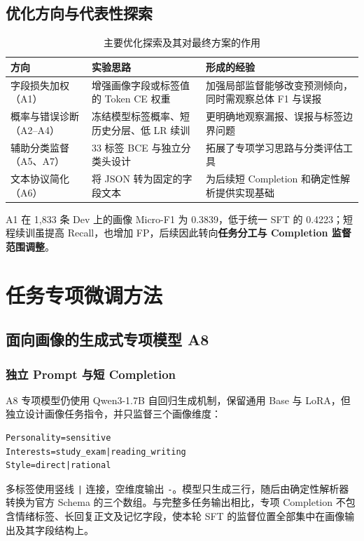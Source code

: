 \documentclass[UTF8,a4paper,zihao=-4,oneside]{ctexrep}
\newcommand{\textterm}[1]{\textbf{#1}}
\begin{document}
\section{优化方向与代表性探索}
\begin{table}[htbp]\centering\caption{主要优化探索及其对最终方案的作用}\label{tab:explorations}
\small
\begin{tabularx}{\linewidth}{P{2.55cm}P{4.0cm}Y}
\toprule
方向 & 实验思路 & 形成的经验\\\midrule
字段损失加权（A1） & 增强画像字段或标签值的 Token CE 权重 & 加强局部监督能够改变预测倾向，同时需观察总体 F1 与误报\\
概率与错误诊断（A2--A4） & 冻结模型标签概率、短历史分层、低 LR 续训 & 更明确地观察漏报、误报与标签边界问题\\
辅助分类监督（A5、A7） & 33 标签 BCE 与独立分类头设计 & 拓展了专项学习思路与分类评估工具\\
文本协议简化（A6） & 将 JSON 转为固定的字段文本 & 为后续短 Completion 和确定性解析提供实现基础\\
\bottomrule
\end{tabularx}
\end{table}

A1 在 1,833 条 Dev 上的画像 Micro-F1 为 0.3839，低于统一 SFT 的 0.4223；短程续训虽提高 Recall，也增加 FP，后续因此转向\textterm{任务分工与 Completion 监督范围调整}。

\chapter{任务专项微调方法}
\section{面向画像的生成式专项模型 A8}
\subsection{独立 Prompt 与短 Completion}
A8 专项模型仍使用 Qwen3-1.7B 自回归生成机制，保留通用 Base 与 LoRA，但独立设计画像任务指令，并只监督三个画像维度：
\begin{Verbatim}[fontsize=\small,frame=single]
Personality=sensitive
Interests=study_exam|reading_writing
Style=direct|rational
\end{Verbatim}
多标签使用竖线 \texttt{|} 连接，空维度输出 \texttt{-}。模型只生成三行，随后由确定性解析器转换为官方 Schema 的三个数组。与完整多任务输出相比，专项 Completion 不包含情绪标签、长回复正文及记忆字段，使本轮 SFT 的监督位置全部集中在画像输出及其字段结构上。
\end{document}
